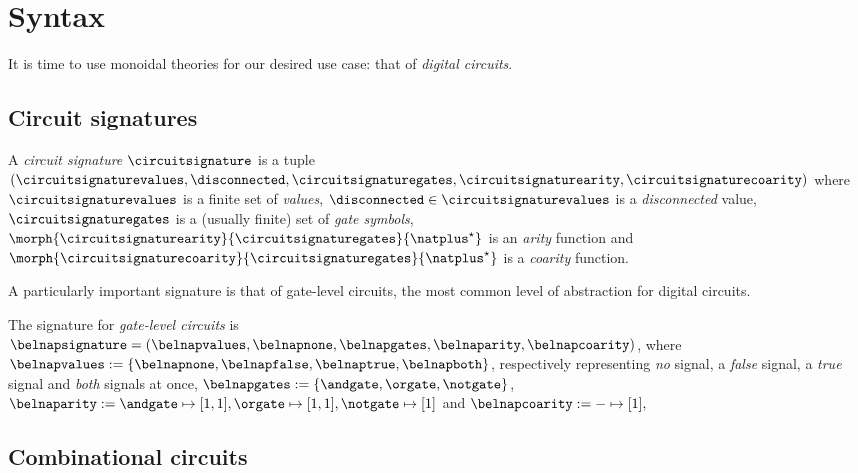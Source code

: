 \chapter{Syntax}

It is time to use monoidal theories for our desired use case: that of
\emph{digital circuits}.

\section{Circuit signatures}

\begin{definition}
    A \emph{circuit signature} \(\circuitsignature\) is a tuple \((
        \circuitsignaturevalues,
        \disconnected,
        \circuitsignaturegates,
        \circuitsignaturearity,
        \circuitsignaturecoarity
    )\) where \(\circuitsignaturevalues\) is a finite set of \emph{values}, \(
        \disconnected \in \circuitsignaturevalues
    \) is a \emph{disconnected} value, \(\circuitsignaturegates\) is a (usually
    finite) set of \emph{gate symbols}, \(
        \morph{\circuitsignaturearity}{\circuitsignaturegates}{\natplus^\star}
    \) is an \emph{arity} function and \(
        \morph{\circuitsignaturecoarity}{\circuitsignaturegates}{\natplus^\star}
    \) is a \emph{coarity} function.
\end{definition}

A particularly important signature is that of gate-level circuits, the most
common level of abstraction for digital circuits.

\begin{example}\label{ex:sig}
    The signature for \emph{gate-level circuits} is \(
        \belnapsignature = (
            \belnapvalues,
            \belnapnone,
            \belnapgates,
            \belnaparity,
            \belnapcoarity
    )\), where \(
        \belnapvalues := \{\belnapnone, \belnapfalse, \belnaptrue, \belnapboth\}
    \), respectively representing \emph{no} signal, a \emph{false} signal, a
        \emph{true} signal and \emph{both} signals at once, \(
        \belnapgates := \{\andgate,\orgate,\notgate\}
    \), \(
        \belnaparity :=
            \andgate \mapsto [1,1],
            \orgate \mapsto [1,1],
            \notgate \mapsto [1]
    \) and \(
        \belnapcoarity := - \mapsto [1],
    \)
\end{example}

\section{Combinational circuits}

